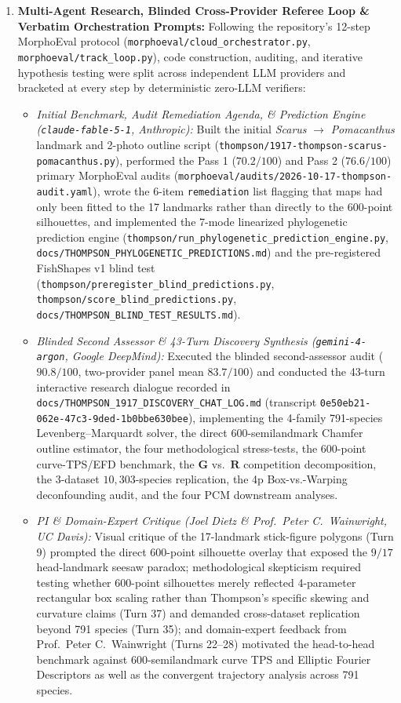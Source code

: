 \documentclass[11pt,a4paper]{article}
\theoremstyle{definition}
\theoremstyle{remark}
\begin{document}
\begin{enumerate}
  \item \textbf{Multi-Agent Research, Blinded Cross-Provider Referee Loop \& Verbatim Orchestration Prompts:}
  Following the repository's 12-step MorphoEval protocol (\texttt{morphoeval/cloud\_orchestrator.py}, \texttt{morphoeval/track\_loop.py}), code construction, auditing, and iterative hypothesis testing were split across independent LLM providers and bracketed at every step by deterministic zero-LLM verifiers:
  \begin{itemize}
    \item \emph{Initial Benchmark, Audit Remediation Agenda, \& Prediction Engine (\texttt{claude-fable-5-1}, Anthropic):} Built the initial \emph{Scarus} $\to$ \emph{Pomacanthus} landmark and 2-photo outline script (\texttt{thompson/1917-thompson-scarus-pomacanthus.py}), performed the Pass 1 ($70.2/100$) and Pass 2 ($76.6/100$) primary MorphoEval audits (\texttt{morphoeval/audits/2026-10-17-thompson-audit.yaml}), wrote the 6-item \texttt{remediation} list flagging that maps had only been fitted to the 17 landmarks rather than directly to the 600-point silhouettes, and implemented the 7-mode linearized phylogenetic prediction engine (\texttt{thompson/run\_phylogenetic\_prediction\_engine.py}, \texttt{docs/THOMPSON\_PHYLOGENETIC\_PREDICTIONS.md}) and the pre-registered FishShapes v1 blind test (\texttt{thompson/preregister\_blind\_predictions.py}, \texttt{thompson/score\_blind\_predictions.py}, \texttt{docs/THOMPSON\_BLIND\_TEST\_RESULTS.md}).
    \item \emph{Blinded Second Assessor \& 43-Turn Discovery Synthesis (\texttt{gemini-4-argon}, Google DeepMind):} Executed the blinded second-assessor audit ($90.8/100$, two-provider panel mean $83.7/100$) and conducted the 43-turn interactive research dialogue recorded in \texttt{docs/THOMPSON\_1917\_DISCOVERY\_CHAT\_LOG.md} (transcript \texttt{0e50eb21-062e-47c3-9ded-1b0bbe630bee}), implementing the 4-family 791-species Levenberg--Marquardt solver, the direct 600-semilandmark Chamfer outline estimator, the four methodological stress-tests, the 600-point curve-TPS/EFD benchmark, the $\mathbf{G}$ vs.\ $\mathbf{R}$ competition decomposition, the 3-dataset $10{,}303$-species replication, the 4p Box-vs.-Warping deconfounding audit, and the four PCM downstream analyses.
    \item \emph{PI \& Domain-Expert Critique (Joel Dietz \& Prof.\ Peter C.\ Wainwright, UC Davis):} Visual critique of the 17-landmark stick-figure polygons (Turn 9) prompted the direct 600-point silhouette overlay that exposed the $9/17$ head-landmark seesaw paradox; methodological skepticism required testing whether 600-point silhouettes merely reflected 4-parameter rectangular box scaling rather than Thompson's specific skewing and curvature claims (Turn 37) and demanded cross-dataset replication beyond 791 species (Turn 35); and domain-expert feedback from Prof.\ Peter C.\ Wainwright (Turns 22--28) motivated the head-to-head benchmark against 600-semilandmark curve TPS and Elliptic Fourier Descriptors as well as the convergent trajectory analysis across 791 species.
  \end{itemize}


\end{enumerate}
\end{document}
